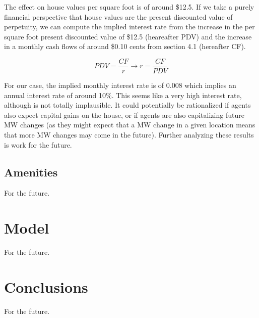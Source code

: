 \documentclass{article}
\begin{document}
The effect on house values per square foot is of around \$12.5. If we take a purely financial perspective that house values are the present discounted value of perpetuity, we can compute the implied interest rate from the increase in the per square foot present discounted value of \$12.5 (heareafter PDV) and the increase in a monthly cash flows of around \$0.10 cents from section 4.1 (hereafter CF).

\begin{equation}
    PDV = \frac{CF}{r} \to r = \frac{CF}{PDV}
\end{equation}

For our case, the implied monthly interest rate is of 0.008 which implies an annual interest rate of around 10\%. This seems like a very high interest rate, although is not totally implausible. It could potentially be rationalized if agents also expect capital gains on the house, or if agents are also capitalizing future MW changes (as they might expect that a MW change in a given location means that more MW changes may come in the future). Further analyzing these results is work for the future. 

\subsection{Amenities}

For the future. 

\section{Model}

For the future.

\section{Conclusions}

For the future.

\nocite{*}
\printbibliography


\end{document}

